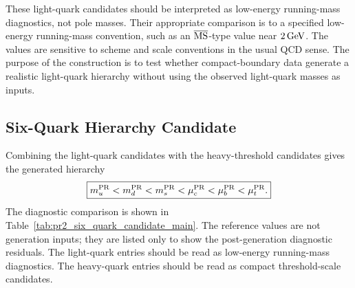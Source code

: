 \documentclass[11pt]{article}
\begin{document}
These light-quark candidates should be interpreted as low-energy running-mass diagnostics, not pole masses. 
Their appropriate comparison is to a specified low-energy running-mass convention, such as an \(\overline{\rm MS}\)-type value \cite{Bardeen1978} near \(2\,{\rm GeV}\). The values are sensitive to scheme and scale conventions in the usual QCD sense. 
The purpose of the construction is to test whether compact-boundary data generate a realistic light-quark hierarchy without using the observed light-quark masses as inputs.

\subsection{Six-Quark Hierarchy Candidate}
\label{sec:pr2_six_quark_hierarchy_candidate}

Combining the light-quark candidates with the heavy-threshold candidates gives the generated hierarchy
\begin{equation}
\boxed{
m_u^{\rm PR}
<
m_d^{\rm PR}
<
m_s^{\rm PR}
<
\mu_c^{\rm PR}
<
\mu_b^{\rm PR}
<
\mu_t^{\rm PR}.
}
\end{equation}
The diagnostic comparison \cite{PDG2024} is shown in Table~\ref{tab:pr2_six_quark_candidate_main}. 
The reference values are not generation inputs; they are listed only to show the post-generation diagnostic residuals. The light-quark entries should be read as low-energy running-mass diagnostics. The heavy-quark entries should be read as compact threshold-scale candidates.
\end{document}
